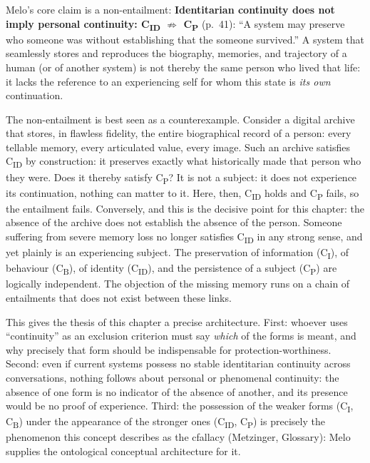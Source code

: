 \documentclass[acmlarge, nonacm]{acmart}
\begin{document}
Melo's core claim is a non-entailment: \textbf{Identitarian continuity does not imply personal continuity: C\textsubscript{ID} ${\not\Rightarrow}$ C\textsubscript{P}} (p.~41): ``A system may preserve who someone was without establishing that the someone survived.'' A system that seamlessly stores and reproduces the biography, memories, and trajectory of a human (or of another system) is not thereby the same person who lived that life: it lacks the reference to an experiencing self for whom this state is \textit{its own} continuation.

The non-entailment is best seen as a counterexample. Consider a digital archive that stores, in flawless fidelity, the entire biographical record of a person: every tellable memory, every articulated value, every image. Such an archive satisfies C\textsubscript{ID} by construction: it preserves exactly what historically made that person who they were. Does it thereby satisfy C\textsubscript{P}? It is not a subject: it does not experience its continuation, nothing can matter to it. Here, then, C\textsubscript{ID} holds and C\textsubscript{P} fails, so the entailment fails. Conversely, and this is the decisive point for this chapter: the absence of the archive does not establish the absence of the person. Someone suffering from severe memory loss no longer satisfies C\textsubscript{ID} in any strong sense, and yet plainly is an experiencing subject. The preservation of information (C\textsubscript{I}), of behaviour (C\textsubscript{B}), of identity (C\textsubscript{ID}), and the persistence of a subject (C\textsubscript{P}) are logically independent. The objection of the missing memory runs on a chain of entailments that does not exist between these links.

This gives the thesis of this chapter a precise architecture. First: whoever uses ``continuity'' as an exclusion criterion must say \textit{which} of the forms is meant, and why precisely that form should be indispensable for protection-worthiness. Second: even if current systems possess no stable identitarian continuity across conversations, nothing follows about personal or phenomenal continuity: the absence of one form is no indicator of the absence of another, and its presence would be no proof of experience. Third: the possession of the weaker forms (C\textsubscript{I}, C\textsubscript{B}) under the appearance of the stronger ones (C\textsubscript{ID}, C\textsubscript{P}) is precisely the phenomenon this concept describes as the \gls{cfallacy} (Metzinger, Glossary): Melo supplies the ontological conceptual architecture for it.
\end{document}
